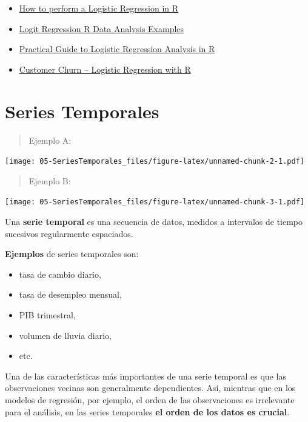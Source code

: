 \documentclass[]{book}
\providecommand{\tightlist}{%
  \setlength{\itemsep}{0pt}\setlength{\parskip}{0pt}}
\begin{document}
\begin{itemize}
\item
  \href{https://www.r-bloggers.com/how-to-perform-a-logistic-regression-in-r/}{How to perform a Logistic Regression in R}
\item
  \href{https://stats.idre.ucla.edu/r/dae/logit-regression/}{Logit Regression \textbar{} R Data Analysis Examples}
\item
  \href{https://www.hackerearth.com/practice/machine-learning/machine-learning-algorithms/logistic-regression-analysis-r/tutorial/}{Practical Guide to Logistic Regression Analysis in R}
\item
  \href{http://www.treselle.com/blog/customer-churn-logistic-regression-with-r/}{Customer Churn -- Logistic Regression with R}
\end{itemize}

\hypertarget{series-temporales}{%
\chapter{Series Temporales}\label{series-temporales}}

\begin{quote}
Ejemplo A:
\end{quote}

\texttt{[image: 05-SeriesTemporales\_files/figure-latex/unnamed-chunk-2-1.pdf]}

\begin{quote}
Ejemplo B:
\end{quote}

\texttt{[image: 05-SeriesTemporales\_files/figure-latex/unnamed-chunk-3-1.pdf]}

Una \textbf{serie temporal} es una secuencia de datos, medidos a intervalos de tiempo sucesivos regularmente espaciados.

\textbf{Ejemplos} de series temporales son:

\begin{itemize}
\tightlist
\item
  tasa de cambio diario,
\item
  tasa de desempleo mensual,
\item
  PIB trimestral,
\item
  volumen de lluvia diario,
\item
  etc.
\end{itemize}

Una de las características más importantes de una serie temporal es que las observaciones vecinas son generalmente dependientes. Así, mientras que en los modelos de regresión, por ejemplo, el orden de las observaciones es irrelevante para el análisis, en las series temporales \textbf{el orden de los datos es crucial}.
\end{document}
